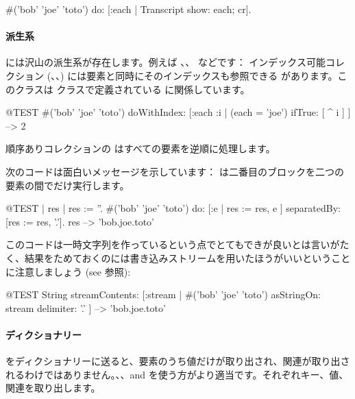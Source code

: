 \documentclass[a4paper,10pt,twoside]{book}
\begin{document}
\begin{code}{}
#('bob' 'joe' 'toto') do: [:each | Transcript show: each; cr].
\end{code}

\paragraph{派生系}  には沢山の派生系が存在します。例えば \mbox{、}\mbox{、} などです：
インデックス可能コレクション (、、) には要素と同時にそのインデックスも参照できる  があります。このクラスは  クラスで定義されている  に関係しています。

\begin{code}{@TEST}
#('bob' 'joe' 'toto') doWithIndex: [:each :i | (each = 'joe') ifTrue: [ ^ i ] ] --> 2
\end{code}

順序ありコレクションの  はすべての要素を逆順に処理します。

次のコードは面白いメッセージを示しています： は二番目のブロックを二つの要素の間でだけ実行します。
\begin{code}{@TEST | res | }
res := ''.
#('bob' 'joe' 'toto') do: [:e | res := res, e ] separatedBy: [res := res, '.'].
res --> 'bob.joe.toto'
\end{code}
\noindent
このコードは一時文字列を作っているという点でとてもできが良いとは言いがたく、結果をためておくのには書き込みストリームを用いたほうがいいということに注意しましょう (see  参照):
\begin{code}{@TEST}
String streamContents: [:stream | #('bob' 'joe' 'toto') asStringOn: stream delimiter: '.' ] --> 'bob.joe.toto'
\end{code}



\paragraph{ディクショナリー}
 をディクショナリーに送ると、要素のうち値だけが取り出され、関連が取り出されるわけではありません。、、and  を使う方がより適当です。それぞれキー、値、関連を取り出します。
\end{document}

